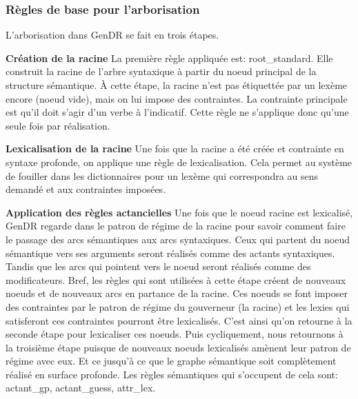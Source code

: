 \subsubsection{Règles de base pour l'arborisation}
L'arborisation dans GenDR se fait en trois étapes.

\textbf{Création de la racine}
La première règle appliquée est: root\_standard. Elle construit la racine de l'arbre syntaxique à partir du noeud principal de la structure sémantique. À cette étape, la racine n'est pas étiquettée par un lexème encore (noeud vide), mais on lui impose des contraintes. La contrainte principale est qu'il doit s'agir d'un verbe à l'indicatif. Cette règle ne s'applique donc qu'une seule fois par réalisation.

\textbf{Lexicalisation de la racine}
Une fois que la racine a été créée et contrainte en syntaxe profonde, on applique une règle de lexicalisation. Cela permet au système de fouiller dans les dictionnaires pour un lexème qui correspondra au sens demandé et aux contraintes imposées.

\textbf{Application des règles actancielles}
Une fois que le noeud racine est lexicalisé, GenDR regarde dans le patron de régime de la racine pour savoir comment faire le passage des arcs sémantiques aux arcs syntaxiques. Ceux qui partent du noeud sémantique vers ses arguments seront réalisés comme des actants syntaxiques. Tandis que les arcs qui pointent vers le noeud seront réalisés comme des modificateurs. Bref, les règles qui sont utilisées à cette étape créent de nouveaux noeuds et de nouveaux arcs en partance de la racine. Ces noeuds se font imposer des contraintes par le patron de régime du gouverneur (la racine) et les lexies qui satisferont ces contraintes pourront être lexicalisés. C'est ainsi qu'on retourne à la seconde étape pour lexicaliser ces noeuds. Puis cycliquement, nous retournons à la troisième étape puisque de nouveaux noeuds lexicalisés amènent leur patron de régime avec eux. Et ce jusqu'à ce que le graphe sémantique soit complètement réalisé en surface profonde. Les règles sémantiques qui s'occupent de cela sont: actant\_gp, actant\_guess, attr\_lex. 

